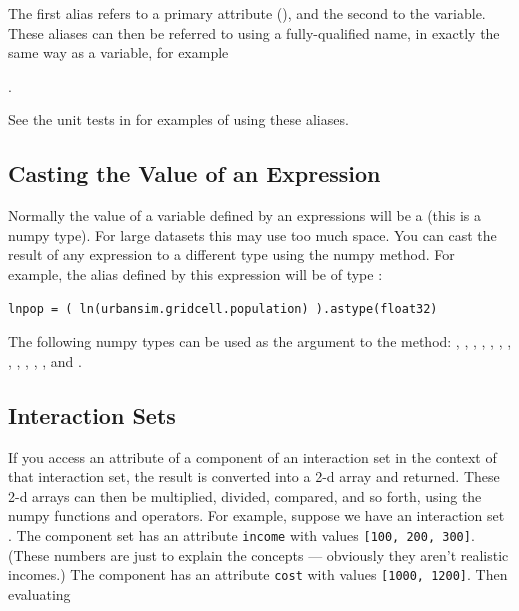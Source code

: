 The first alias refers to a primary attribute (),
and the second to the variable.  These aliases can then be referred to
using a fully-qualified name, in exactly the same way as a variable,
for example

.  

See the unit tests in
 for examples of
using these aliases.

\subsection{Casting the Value of an Expression}

Normally the value of a variable defined by an expressions will be a
 (this is a numpy type).  For large datasets this may use too
much space.  You can cast the result of any expression to a different type
using the numpy  method.  For example, the alias defined by
this expression will be of type :

\begin{verbatim}
lnpop = ( ln(urbansim.gridcell.population) ).astype(float32)
\end{verbatim}

The following numpy types can be used as the argument to the 
method: , , , ,
, , , , 
, , , , and
.
 
\subsection{Interaction Sets}

If you access an attribute of a component of an interaction set in the
context of that interaction set, the result is converted into a 2-d array
and returned.  These 2-d arrays can then be multiplied, divided, compared,
and so forth, using the numpy functions and operators.  For example,
suppose we have an interaction set .  The
component  set has an attribute \verb|income| with values
\verb|[100, 200, 300]|.  (These numbers are just to explain the concepts
--- obviously they aren't realistic incomes.)  The 
component has an attribute \verb|cost| with values \verb|[1000, 1200]|.
Then evaluating

